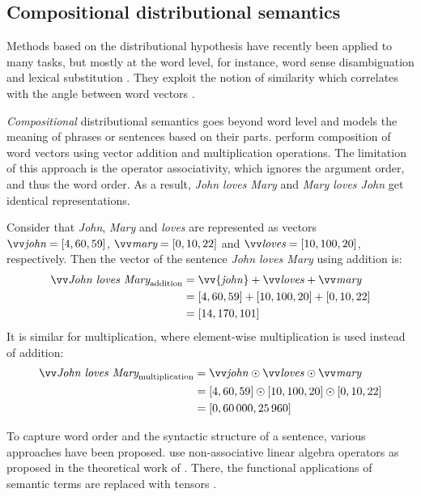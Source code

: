 \subsection{Compositional distributional semantics}
\label{sec:composition}

Methods based on the distributional hypothesis have recently been applied to many tasks, but mostly at the word level, for instance, word sense disambiguation \cite{ZhitomirskyGeffet2009} and lexical substitution \cite{Thater:2010:CSR:1858681.1858778}. They exploit the notion of similarity which correlates with the angle between word vectors \cite{Turney:2010:FMV:1861751.1861756}.

\emph{Compositional} distributional semantics goes beyond word level and models the meaning of phrases or sentences based on their parts.  perform composition of word vectors using vector addition and multiplication operations. The limitation of this approach is the operator associativity, which ignores the argument order, and thus the word order. As a result, \textit{John loves Mary} and \textit{Mary loves John} get identical representations.

Consider that \textit{John}, \textit{Mary} and \textit{loves} are represented as vectors $\ov{\text{\it john}} = [4, 60, 59]$, $\ov{\text{\it mary}} = [0, 10, 22]$ and $\ov{\text{\it loves}} = [10, 100, 20]$, respectively. Then the vector of the sentence \textit{John loves Mary} using addition is:
%
\begin{align*}
  \ov{\text{\it John loves Mary}}_{\text{addition}} &= \vv{\mathit{john}} + \ov{\mathit{loves}} + \ov{\mathit{mary}} \\
                                  &= [4, 60, 59] + [10, 100, 20] + [0, 10, 22] \\
                                  &= [14, 170, 101]
\end{align*}
%
It is similar for multiplication, where element-wise multiplication is used instead of addition:
%
\begin{align*}
  \ov{\text{\it John loves Mary}}_{\text{multiplication}} &= \ov{\mathit{john}} \odot \ov{\mathit{loves}} \odot \ov{\mathit{mary}} \\
                                  &= [4, 60, 59] \odot [10, 100, 20] \odot [0, 10, 22] \\
                                  &= [0, 60\,000, 25\,960]
\end{align*}

To capture word order and the syntactic structure of a sentence, various approaches have been proposed.  use non-associative linear algebra operators as proposed in the theoretical work of . There, the functional applications of semantic terms are replaced with tensors \cite{Bourbaki1998commutative}.

